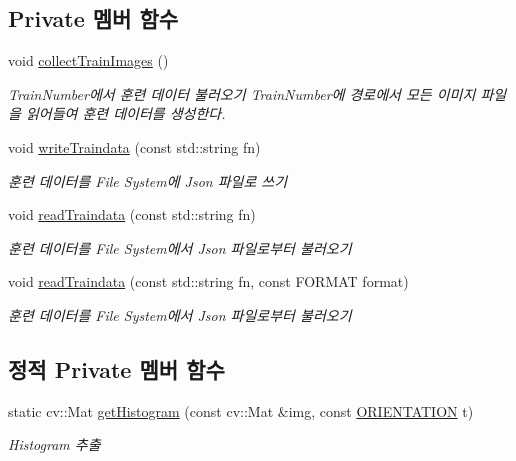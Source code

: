 \subsection*{Private 멤버 함수}
\begin{DoxyCompactItemize}
\item 
\mbox{\label{class_o_c_r_a9d4b78ff145b1e89ac05eb0f194d1948}} 
void \hyperlink{class_o_c_r_a9d4b78ff145b1e89ac05eb0f194d1948}{collect\+Train\+Images} ()
\begin{DoxyCompactList}\small\item\em Train\+Number에서 훈련 데이터 불러오기 \textquotesingle{}Train\+Number\textquotesingle{}에 경로에서 모든 이미지 파일을 읽어들여 훈련 데이터를 생성한다. \end{DoxyCompactList}\item 
void \hyperlink{class_o_c_r_aac52dda47989cde2ba9c674de77bd2ce}{write\+Traindata} (const std\+::string fn)
\begin{DoxyCompactList}\small\item\em 훈련 데이터를 File System에 Json 파일로 쓰기 \end{DoxyCompactList}\item 
void \hyperlink{class_o_c_r_a27494f2dca260d6710c332897c31f716}{read\+Traindata} (const std\+::string fn)
\begin{DoxyCompactList}\small\item\em 훈련 데이터를 File System에서 Json 파일로부터 불러오기 \end{DoxyCompactList}\item 
void \hyperlink{class_o_c_r_acef1528ddf01f01f301dcd489ec427fb}{read\+Traindata} (const std\+::string fn, const F\+O\+R\+M\+AT format)
\begin{DoxyCompactList}\small\item\em 훈련 데이터를 File System에서 Json 파일로부터 불러오기 \end{DoxyCompactList}\end{DoxyCompactItemize}
\subsection*{정적 Private 멤버 함수}
\begin{DoxyCompactItemize}
\item 
static cv\+::\+Mat \hyperlink{class_o_c_r_af4dd76ed4fdaeb65ca3768755d7e3033}{get\+Histogram} (const cv\+::\+Mat \&img, const \hyperlink{class_o_c_r_ad50a9d013dc2ee50341eee5b9e326686}{O\+R\+I\+E\+N\+T\+A\+T\+I\+ON} t)
\begin{DoxyCompactList}\small\item\em Histogram 추출 \end{DoxyCompactList}\end{DoxyCompactItemize}

